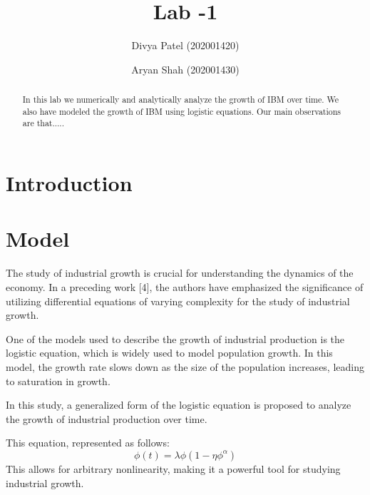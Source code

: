 \documentclass[aps,twocolumn,10pt,reprint]{revtex4}
\newcommand{\be}{\begin{equation}}
\newcommand{\ee}{\end{equation}}
\begin{document}
\title{Lab -1}

\author{Divya Patel (202001420)}
\author{Aryan Shah (202001430)}

\begin{abstract}

In this lab we numerically and analytically analyze the growth of IBM over time. We also have modeled the growth of IBM using logistic equations. Our main observations are that.....   

\end{abstract}
\maketitle
\section{Introduction}

\section{Model}


The study of industrial growth is crucial for understanding the dynamics of the economy. In a preceding work [4], the authors have emphasized the significance of utilizing differential equations of varying complexity for the study of industrial growth.

One of the models used to describe the growth of industrial production is the logistic equation, which is widely used to model population growth. In this model, the growth rate slows down as the size of the population increases, leading to saturation in growth.

In this study, a generalized form of the logistic equation is proposed to analyze the growth of industrial production over time. 

This equation, represented as follows:\\ 
\be\label{Eq:Logistic}
\phi(t) = \lambda \phi (1 - \eta \phi^{\alpha}) 
\ee 
This allows for arbitrary nonlinearity, making it a powerful tool for studying industrial growth.
\end{document}
